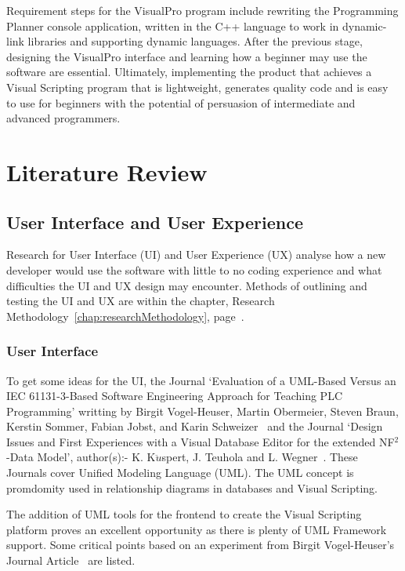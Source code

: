 \documentclass[12pt]{report} %
\begin{document}
	Requirement steps for the VisualPro program include rewriting the Programming Planner console application, written in the C++ language to work in dynamic-link libraries and supporting dynamic languages. After the previous stage, designing the VisualPro interface and learning how a beginner may use the software are essential. Ultimately, implementing the product that achieves a Visual Scripting program that is lightweight, generates quality code and is easy to use for beginners with the potential of persuasion of intermediate and advanced programmers.

\chapter{Literature Review}
\label{sec:literatureReview}
	\section{User Interface and User Experience}
	\label{subsec:userInterfaceUserExperience}
        Research for User Interface (UI) and User Experience (UX) analyse how a new developer would use the software with little to no coding experience and what difficulties the UI and UX design may encounter. Methods of outlining and testing the UI and UX are within the chapter, Research Methodology~\ref{chap:researchMethodology}, page~\pageref{chap:researchMethodology}.

		\subsection{User Interface}
		\label{subsec:userInterface}
			To get some ideas for the UI, the Journal `Evaluation of a UML-Based Versus an IEC 61131-3-Based Software Engineering Approach for Teaching PLC Programming' writting by Birgit Vogel-Heuser, Martin Obermeier, Steven Braun, Kerstin Sommer, Fabian Jobst, and Karin Schweizer~\cite{vogel-heuser_evaluation_2013} and the Journal `Design Issues and First Experiences with a Visual Database Editor for the extended NF$^{2}$-Data Model', author(s):- K. K${\ddot{u}}$spert, J. Teuhola and L. Wegner~\cite{kuspert_design_1990}. These Journals cover Unified Modeling Language (UML). The UML concept is promdomity used in relationship diagrams in databases and Visual Scripting. 

			The addition of UML tools for the frontend to create the Visual Scripting platform proves an excellent opportunity as there is plenty of UML Framework support. Some critical points based on an experiment from Birgit Vogel-Heuser's Journal Article~\cite{vogel-heuser_evaluation_2013} are listed.
\end{document}
